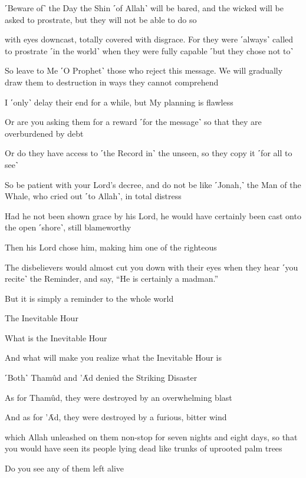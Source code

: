 ˹Beware of˺ the Day the Shin ˹of Allah˺ will be bared, and the wicked will be asked to prostrate, but they will not be able to do so

with eyes downcast, totally covered with disgrace. For they were ˹always˺ called to prostrate ˹in the world˺ when they were fully capable ˹but they chose not to˺

So leave to Me ˹O Prophet˺ those who reject this message. We will gradually draw them to destruction in ways they cannot comprehend

I ˹only˺ delay their end for a while, but My planning is flawless

Or are you asking them for a reward ˹for the message˺ so that they are overburdened by debt

Or do they have access to ˹the Record in˺ the unseen, so they copy it ˹for all to see˺

So be patient with your Lord’s decree, and do not be like ˹Jonah,˺ the Man of the Whale, who cried out ˹to Allah˺, in total distress

Had he not been shown grace by his Lord, he would have certainly been cast onto the open ˹shore˺, still blameworthy

Then his Lord chose him, making him one of the righteous

The disbelievers would almost cut you down with their eyes when they hear ˹you recite˺ the Reminder, and say, “He is certainly a madman.”

But it is simply a reminder to the whole world

The Inevitable Hour

What is the Inevitable Hour

And what will make you realize what the Inevitable Hour is

˹Both˺ Thamûd and ’Ȃd denied the Striking Disaster

As for Thamûd, they were destroyed by an overwhelming blast

And as for ’Ȃd, they were destroyed by a furious, bitter wind

which Allah unleashed on them non-stop for seven nights and eight days, so that you would have seen its people lying dead like trunks of uprooted palm trees

Do you see any of them left alive

